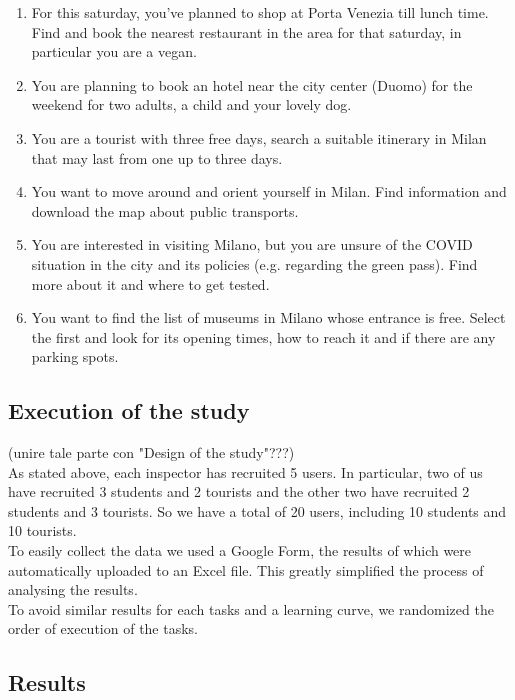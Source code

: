     \begin{enumerate}
        \item For this saturday, you've planned to shop at Porta Venezia till lunch time. Find and book the nearest restaurant in the area for that saturday, in particular you are a vegan.
        \item You are planning to book an hotel near the city center (Duomo) for the weekend for two adults, a child and your lovely dog.
        \item You are a tourist with three free days, search a suitable itinerary in Milan that may last from one up to three days.
        \item You want to move around and orient yourself in Milan. Find information and download the map about public transports.
        \item You are interested in visiting Milano, but you are unsure of the COVID situation in the city and its policies (e.g. regarding the green pass). Find more about it and where to get tested.
        \item You want to find the list of museums in Milano whose entrance is free. Select the first and look for its opening times, how to reach it and if there are any parking spots.
    \end{enumerate}
    
\subsection{Execution of the study}
    (unire tale parte con "Design of the study"???)\\
    As stated above, each inspector has recruited 5 users. In particular, two of us have recruited 3 students and 2 tourists and the other two have recruited 2 students and 3 tourists. So we have a total of 20 users, including 10 students and 10 tourists.\\
    To easily collect the data we used a Google Form, the results of which were automatically uploaded to an Excel file. This greatly simplified the process of analysing the results.\\
    To avoid similar results for each tasks and a learning curve, we randomized the order of execution of the tasks.

\subsection{Results}

